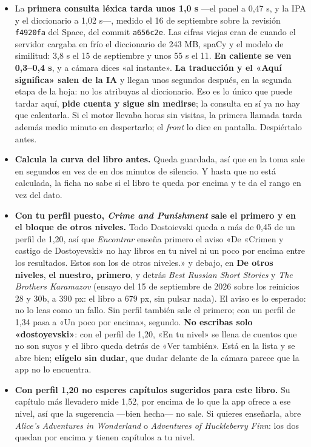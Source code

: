\documentclass[11pt,a4paper]{article}
\begin{document}
\begin{ve}
\begin{itemize}
  \item La \textbf{primera consulta léxica tarda unos 1,0 s} ---el panel a 0,47 s, y
        la IPA y el diccionario a 1,02 s---, medido el 16 de septiembre sobre la
        revisión \texttt{f4920fa} del Space, del commit \texttt{a656c2e}. Las cifras
        viejas eran de cuando el servidor cargaba en frío el diccionario de 243 MB,
        spaCy y el modelo de similitud: 3,8 s el 15 de septiembre y unos 55 s el 11.
        \textbf{En caliente se ven 0,3--0,4 s}, y a cámara dices «al instante».
        \textbf{La traducción y el «Aquí significa» salen de la IA} y llegan unos
        segundos después, en la segunda etapa de la hoja: no los atribuyas al
        diccionario. Eso es lo único que puede tardar aquí, \textbf{pide cuenta y sigue
        sin medirse}; la consulta en sí ya no hay que calentarla. Si el motor
        llevaba horas sin visitas, la primera llamada tarda además medio minuto
        en despertarlo; el \emph{front} lo dice en pantalla. Despiértalo antes.
  \item \textbf{Calcula la curva del libro antes.} Queda guardada, así que en la
        toma sale en segundos en vez de en dos minutos de silencio. Y hasta que no
        está calculada, la ficha no sabe si el libro te queda por encima y te da el
        rango en vez del dato.
  \item \textbf{Con tu perfil puesto, \emph{Crime and Punishment} sale el primero y en
        el bloque de otros niveles.} Todo Dostoievski queda a más de 0,45 de un perfil
        de 1,20, así que \emph{Encontrar} enseña primero el aviso «De «Crimen y castigo
        de Dostoyevski» no hay libros en tu nivel ni un poco por encima entre los
        resultados. Estos son los de otros niveles.» y debajo, en \textbf{De otros
        niveles}, \textbf{el nuestro, primero}, y detrás \emph{Best Russian Short
        Stories} y \emph{The Brothers Karamazov} (ensayo del 15 de septiembre de 2026
        sobre los reinicios 28 y 30b, a 390 px: el libro a 679 px, sin pulsar nada). El aviso es lo esperado: no lo leas
        como un fallo. Sin perfil también sale el primero; con un perfil de 1,34 pasa a
        «Un poco por encima», segundo. \textbf{No escribas solo «dostoyevski»}: con el
        perfil de 1,20, «En tu nivel» se llena de cuentos que no son suyos y el libro
        queda detrás de «Ver también». Está en la lista y se abre bien; \textbf{elígelo
        sin dudar}, que dudar delante de la cámara parece que la app no lo encuentra.
  \item \textbf{Con perfil 1,20 no esperes capítulos sugeridos para este libro.}
        Su capítulo más llevadero mide 1,52, por encima de lo que la app ofrece a
        ese nivel, así que la sugerencia ---bien hecha--- no sale. Si quieres
        enseñarla, abre \emph{Alice's Adventures in Wonderland} o
        \emph{Adventures of Huckleberry Finn}: los dos quedan por encima y tienen
        capítulos a tu nivel.
\end{itemize}


\end{ve}
\end{document}
